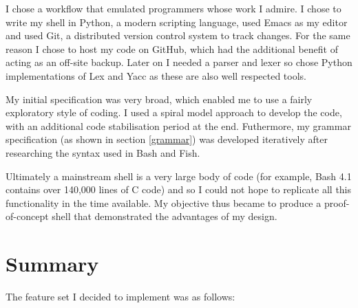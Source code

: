 \documentclass[12pt,twoside,notitlepage]{report}
\begin{document}
I chose a workflow that emulated programmers whose work I admire. I
chose to write my shell in Python, a modern scripting language, used
Emacs as my editor and used Git, a distributed version control system
to track changes. For the same reason I chose to host my code on GitHub,
which had the additional benefit of acting as an off-site
backup. Later on I needed a parser and lexer so chose Python
implementations of Lex and Yacc as these are also well respected tools.

My initial specification was very broad, which enabled me to use a
fairly exploratory style of coding. I used a spiral model approach to
develop the code, with an additional code stabilisation period at the
end. Futhermore, my grammar specification (as shown in section
\ref{grammar}) was developed iteratively after researching the syntax
used in Bash and Fish.

Ultimately a mainstream shell is a very large body of code (for
example, Bash 4.1 contains over 140,000 lines of C
code\footnotemark[1]) and so I could not hope to replicate all this
functionality in the time available. My objective thus became to
produce a proof-of-concept shell that demonstrated the advantages of
my design.


\section{Summary}

The feature set I decided to implement was as follows:
\end{document}
